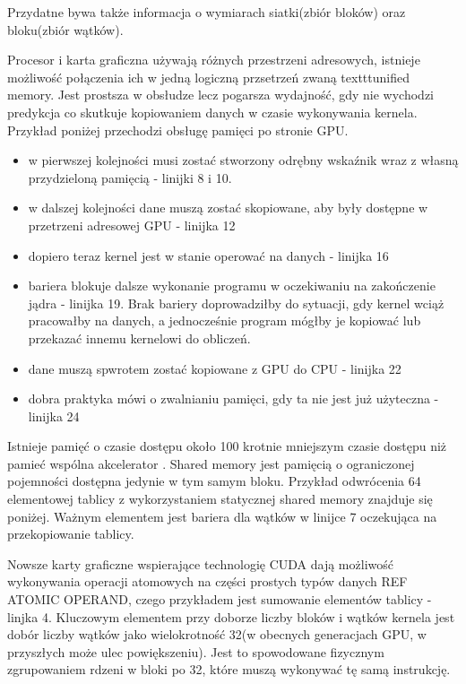 Przydatne bywa także informacja o wymiarach siatki(zbiór bloków) oraz bloku(zbiór wątków).


Procesor i karta graficzna używają różnych przestrzeni adresowych, istnieje możliwość połączenia ich w jedną logiczną przsetrzeń zwaną texttt{unified memory}. Jest prostsza w obsłudze lecz pogarsza wydajność, gdy nie wychodzi predykcja co skutkuje kopiowaniem danych w czasie wykonywania kernela. Przykład poniżej przechodzi obsługę pamięci po stronie GPU.
\begin{itemize}
\item w pierwszej kolejności musi zostać stworzony odrębny wskaźnik wraz z własną przydzieloną pamięcią - linijki 8 i 10.
\item w dalszej kolejności dane muszą zostać skopiowane, aby były dostępne w przetrzeni adresowej GPU - linijka 12
\item dopiero teraz kernel jest w stanie operować na danych - linijka 16
\item bariera blokuje dalsze wykonanie programu w oczekiwaniu na zakończenie jądra - linijka 19. Brak bariery doprowadziłby do sytuacji, gdy kernel wciąż pracowałby na danych, a jednocześnie program mógłby je kopiować lub przekazać innemu kernelowi do obliczeń.
\item dane muszą spwrotem zostać kopiowane z GPU do CPU - linijka 22
\item dobra praktyka mówi o zwalnianiu pamięci, gdy ta nie jest już użyteczna - linijka 24
\end{itemize}


Istnieje pamięć o czasie dostępu około 100 krotnie mniejszym czasie dostępu niż pamieć wspólna akcelerator \cite{Sha13}. Shared memory jest pamięcią o ograniczonej pojemności dostępna jedynie w tym samym bloku. Przykład odwrócenia 64 elementowej tablicy z wykorzystaniem statycznej shared memory znajduje się poniżej. Ważnym elementem jest bariera dla wątków w linijce 7 oczekująca na przekopiowanie tablicy.


Nowsze karty graficzne wspierające technologię CUDA dają możliwość wykonywania operacji atomowych na części prostych typów danych REF ATOMIC OPERAND, czego przykładem jest sumowanie elementów tablicy - linjka 4. Kluczowym elementem przy doborze liczby bloków i wątków kernela jest dobór liczby wątków jako wielokrotność 32(w obecnych generacjach GPU, w przyszłych może ulec powiększeniu). Jest to spowodowane fizycznym zgrupowaniem rdzeni w bloki po 32, które muszą wykonywać tę samą instrukcję. 


